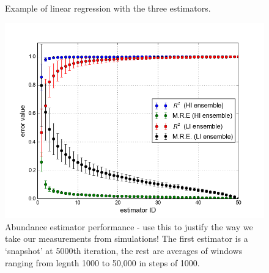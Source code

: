 \begin{figure}[hp]
	\centering
    \caption{Example of linear regression with the three estimators.}    
    \label{fig:regression_exmaple}
\end{figure}

\begin{figure}[h]
	\centering
	\includegraphics[width=1.0\linewidth]{"./chapters/chapter04b/figures/Reliability/error_versus_estimator"}
    \caption{Abundance estimator performance - use this to justify the way we take our measurements from simulations! The first estimator is a `snapshot' at 5000th iteration, the rest are averages of windows ranging from legnth 1000 to 50,000 in steps of 1000.}    
    \label{fig:error_versus_estimator}
\end{figure}

